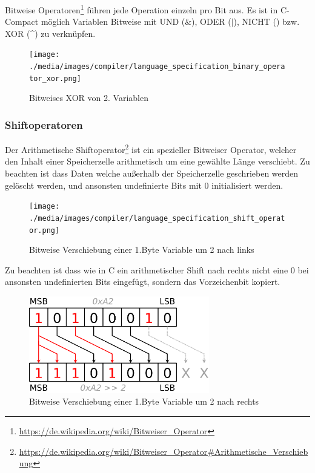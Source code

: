 Bitweise Operatoren\footnote{\url{https://de.wikipedia.org/wiki/Bitweiser_Operator}} f\"uhren jede Operation einzeln pro Bit aus. Es ist in C-Compact m\"oglich Variablen Bitweise mit UND ($\&$), ODER ($|$), NICHT (\raisebox{-0.9ex}{\~{ }}) bzw. 
XOR (\^{}) zu verkn\"upfen.

\begin{figure}[h]
\centering
\texttt{[image: ./media/images/compiler/language\_specification\_binary\_operator\_xor.png]}
\caption{Bitweises XOR von 2. Variablen}
\label{language_specification_binary_operator_xor}
\end{figure}

\newpage
\subsubsection{Shiftoperatoren}

Der Arithmetische Shiftoperator\footnote{\url{https://de.wikipedia.org/wiki/Bitweiser_Operator\#Arithmetische_Verschiebung}} ist ein spezieller Bitweiser Operator, welcher den Inhalt einer Speicherzelle arithmetisch um eine gew\"ahlte L\"ange verschiebt. Zu beachten ist dass Daten welche außerhalb der Speicherzelle geschrieben werden gel\"oscht werden, und ansonsten undefinierte Bits mit 0 initialisiert werden.

\begin{figure}[h]
\centering
\texttt{[image: ./media/images/compiler/language\_specification\_shift\_operator.png]}
\caption{Bitweise Verschiebung einer 1.Byte Variable um 2 nach links}
\label{language_specification_shift_operator}
\end{figure}

Zu beachten ist dass wie in C ein arithmetischer Shift nach rechts nicht eine 0 bei ansonsten undefinierten Bits eingef\"ugt, sondern das Vorzeichenbit kopiert.

\begin{figure}[h]
\centering
\includegraphics[width=0.7\textwidth]{./media/images/compiler/language_specification_shift_operator_right.png}
\caption{Bitweise Verschiebung einer 1.Byte Variable um 2 nach rechts}
\label{language_specification_shift_operator_right}
\end{figure}

